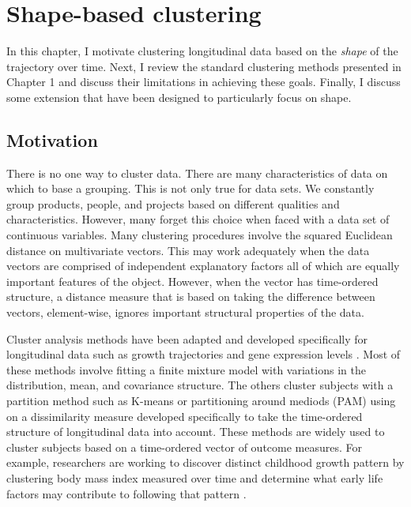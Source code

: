\chapter{Shape-based clustering}

 In this chapter, I motivate clustering longitudinal data based on the {\em shape} of the trajectory over time. Next, I review the standard clustering methods presented in Chapter 1 and discuss their limitations in achieving these goals. Finally, I discuss some extension that have been designed to particularly focus on shape.

\section{Motivation}
There is no one way to cluster data. There are many characteristics of data on which to base a grouping. This is not only true for data sets. We constantly group products, people, and projects based on different qualities and characteristics. However, many forget this choice when faced with a data set of continuous variables. Many clustering procedures involve the squared Euclidean distance on multivariate vectors. This may work adequately when the data vectors are comprised of independent explanatory factors all of which are equally important features of the object. However, when the vector has time-ordered structure, a distance measure that is based on taking the difference between vectors, element-wise, ignores important structural properties of the data.  

Cluster analysis methods have been adapted and developed specifically for longitudinal data such as growth trajectories and gene expression levels \cite{schneiderman1993,genolini2010, jones2001, muthen2010, mcnicholas2010}. Most of these methods involve fitting a finite mixture model with variations in the distribution, mean, and covariance structure. The others cluster subjects with a partition method such as K-means \cite{macqueen1967,hartigan1979,} or partitioning around mediods (PAM) \cite{kaufman1990} using on a dissimilarity measure developed specifically to take the time-ordered structure of longitudinal data into account. These methods are widely used to cluster subjects based on a time-ordered vector of outcome measures. For example, researchers are working to discover distinct childhood growth pattern by clustering body mass index measured over time and determine what early life factors may contribute to following that pattern \cite{pryor2011,carter2012}. 

